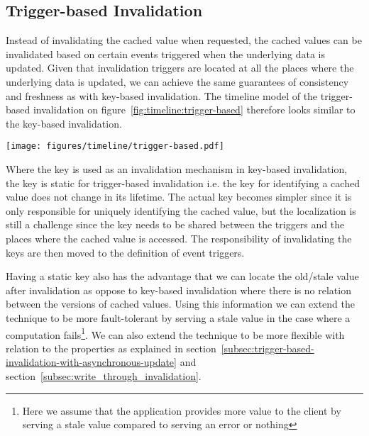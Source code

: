 

\subsection{Trigger-based Invalidation}
\label{subsec:trigger_based_invalidation}

Instead of invalidating the cached value when requested, the cached values can be invalidated based on certain events triggered when the underlying data is updated. Given that invalidation triggers are located at all the places where the underlying data is updated, we can achieve the same guarantees of consistency and freshness as with key-based invalidation. The timeline model of the trigger-based invalidation on figure~\ref{fig:timeline:trigger-based} therefore looks similar to the key-based invalidation.

\begin{figure*}[ht!]
  \centering
  \texttt{[image: figures/timeline/trigger-based.pdf]}
  \caption{The lifecycle of the trigger-based invalidation technique}
  \label{fig:timeline:trigger-based}
\end{figure*}

Where the key is used as an invalidation mechanism in key-based invalidation, the key is static for trigger-based invalidation i.e. the key for identifying a cached value does not change in its lifetime. The actual key becomes simpler since it is only responsible for uniquely identifying the cached value, but the localization is still a challenge since the key needs to be shared between the triggers and the places where the cached value is accessed. The responsibility of invalidating the keys are then moved to the definition of event triggers.

Having a static key also has the advantage that we can locate the old/stale value after invalidation as oppose to key-based invalidation where there is no relation between the versions of cached values. Using this information we can extend the technique to be more fault-tolerant by serving a stale value in the case where a computation fails\footnote{Here we assume that the application provides more value to the client by serving a stale value compared to serving an error or nothing}. We can also extend the technique to be more flexible with relation to the properties as explained in section~\ref{subsec:trigger-based-invalidation-with-asynchronous-update} and section~\ref{subsec:write_through_invalidation}.

